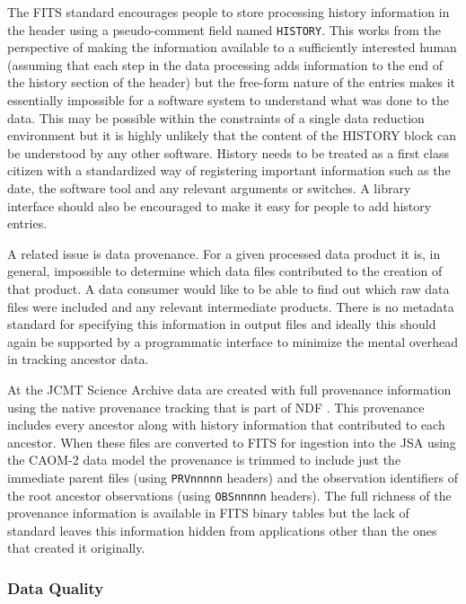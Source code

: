 \documentclass[final,authoryear,5p,times,twocolumn]{elsarticle}
\begin{document}
The FITS standard encourages people to store processing history
information in the header using a pseudo-comment field named
\texttt{HISTORY}. This works from the perspective of making the information
available to a sufficiently interested human (assuming that each step in the
data processing adds information to the end of the history section of the
header) but the free-form nature of the entries makes it essentially
impossible for a software system to understand what was done to the data.
This may be possible within the constraints of a single data reduction
environment but it is highly unlikely that the content of the HISTORY block
can be understood by any other software. History needs to be treated as a
first class citizen with a standardized way of registering important
information such as the date, the software tool and any relevant arguments
or switches. A library interface should also be encouraged to make it easy
for people to add history entries.


A related issue is data provenance. For a given processed data product
it is, in general, impossible to determine which data files
contributed to the creation of that product. A data consumer
would like to be able to find out which
raw data files were included and any relevant intermediate
products. There is no metadata standard for specifying this
information in output files and ideally this should again be supported
by a programmatic interface to minimize the mental overhead in
tracking ancestor data.

At the JCMT Science Archive \citep[JSA;][]{2008ASPC..394..135G} data are
created with full provenance information using the native provenance
tracking that is part of NDF \citep{2009ASPC..411..418J}. This
provenance includes every ancestor along with history information that
contributed to each ancestor. When these files are converted to FITS
for ingestion into the JSA using the CAOM-2 data model
\citep{2013ASPC..475..159R} the provenance is trimmed to include
just the immediate parent files (using \texttt{PRVnnnnn} headers)
and the observation identifiers of the root ancestor observations
(using \texttt{OBSnnnnn} headers). The full richness of the provenance
information is available in FITS binary tables but the lack of standard
leaves this information hidden from applications other than the ones
that created it originally.

\subsubsection{Data Quality}
\end{document}
